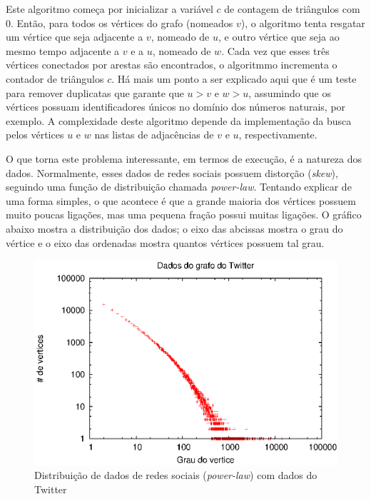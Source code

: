 Este algoritmo começa por inicializar a variável $c$ de contagem de triângulos com $0$. Então, para
todos os vértices do grafo (nomeados $v$), o algoritmo tenta resgatar um vértice que seja adjacente a 
$v$, nomeado de $u$, e outro vértice que seja ao mesmo tempo adjacente a $v$ e a $u$, nomeado de $w$.
Cada vez que esses três vértices conectados por arestas são encontrados, o algoritmmo incrementa o 
contador de triângulos $c$. Há mais um ponto a ser explicado aqui que é um teste para remover duplicatas
que garante que $u>v$ e $w>u$, assumindo que os vértices possuam identificadores únicos no domínio dos
números naturais, por exemplo. A complexidade deste algoritmo depende da implementação da busca pelos 
vértices $u$ e $w$ nas listas de adjacências de $v$ e $u$, respectivamente.

O que torna este problema interessante, em termos de execução, é a natureza dos dados. Normalmente, esses
dados de redes sociais possuem distorção (\emph{skew}), seguindo uma função de distribuição chamada 
\emph{power-law}. Tentando explicar de uma forma simples, o que acontece é que a grande maioria dos 
vértices possuem muito poucas ligações, mas uma pequena fração possui muitas ligações. O gráfico abaixo 
mostra a distribuição dos dados; o eixo das abcissas mostra o grau do vértice e o eixo das ordenadas 
mostra quantos vértices possuem tal grau.

\begin{figure}[h!]
	\centerline{\includegraphics{power_law.eps}}
	\caption{Distribuição de dados de redes sociais (\emph{power-law}) com dados do Twitter}
	\label{fig:powerlaw}
\end{figure}

